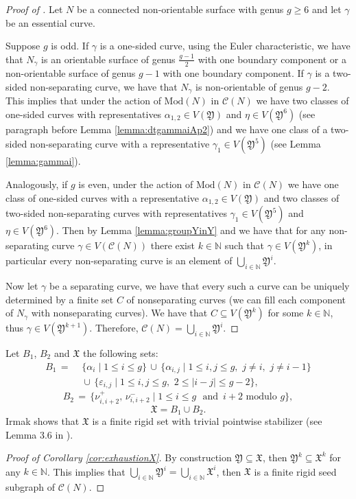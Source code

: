 \documentclass{artv3}
\newcommand*{\cg}[1]{\mathcal{C}(#1)}
\newcommand*{\mcg}[1]{\mathrm{Mod}(#1)}
\newcommand*{\Y}{\mathfrak{Y}}
\newcommand*{\X}{\mathfrak{X}}
\newcommand{\N}{\ensuremath{\mathbb{N}}}
\begin{document}
\begin{proof}[Proof of ]
Let $N$ be a connected non-orientable surface with genus $g\geq 6$ and let $\gamma$ be an essential curve. 

Suppose $g$ is odd. If $\gamma$  is a one-sided curve, using the Euler characteristic, we have that $N_{\gamma}$ is an orientable surface of genus $\frac{g-1}{2}$ with one boundary component or a non-orientable surface of genus $g-1$ with one boundary component. If $\gamma$ is a two-sided non-separating curve, we have that $N_{\gamma}$ is non-orientable of genus $g-2$. This implies that under the action of $\mcg{N}$ in $\cg{N}$ we have two classes of one-sided curves with representatives $\alpha_{1,2} \in V(\Y)$ and $\eta \in V(\Y^{6})$ (see paragraph before Lemma \ref{lemma:dtgammaiAp2}) and we have one class of a two-sided non-separating curve with a representative $\gamma_{1}\in V(\Y^{5})$ (see Lemma \ref{lemma:gammai}).

Analogously, if $g$ is even, under the action of $\mcg{N}$ in $\cg{N}$ we have one class of one-sided curves with a representative  $\alpha_{1,2} \in V(\Y)$ and two classes of two-sided non-separating curves with representatives $\gamma_1 \in V(\Y^{5})$ and $\eta\in V(\Y^{6})$.
Then by Lemma \ref{lemma:groupYinY} and  we have that for any non-separating curve $\gamma \in V(\cg{N})$ there exist $k\in\N$ such that $\gamma \in V(\Y^{k})$, in particular every non-separating curve is an element of $\bigcup_{i\in \N} \Y^{i}$.

Now let $\gamma$ be a separating curve, we have that every such a curve can be uniquely determined by a finite set $C$ of nonseparating curves (we can fill each component of $N_{\gamma}$ with nonseparating curves). We have that $C\subseteq V(\Y^{k})$ for some $k\in \N$, thus $\gamma\in V(\Y^{k+1})$. Therefore, $\cg{N} = \bigcup_{i\in \N}\Y^{i}$.
\end{proof}


Let $B_{1}$, $B_{2}$  and $\X$ the following sets:
\begin{align*}
B_1 \, = & \, \, \{ \alpha_{i} \mid 1\leq i \leq g \}\, \cup \, \{\alpha_{i,j} \mid 1\leq i,j\leq g, \,\, j\neq i, \,\, j \neq i-1   \}\\ 
& \,\, \cup \,  \{\varepsilon_{i,j} \mid  1\leq i,j\leq g, \,\, 2 \leq |i-j| \leq g-2  \},
\end{align*}
$$
B_{2}\, = \,\{\nu^{+}_{i,i+2},\, \nu^{-}_{i,i+2} \mid 1\leq i \leq g \,\, \text{ and } \, i+2 \text{ modulo } g  \},
$$
$$
\X = B_1\cup B_2.
$$
Irmak shows that $\X$ is a finite  rigid set with trivial pointwise stabilizer (see Lemma 3.6 in \cite{Irmak2019}).


\begin{proof}[Proof of Corollary \ref{cor:exhaustionX}]
 By construction $\Y\subseteq \X$, then  $\Y^{k} \subseteq \X^{k}$ for any  $k\in \N$. This implies that $\bigcup_{i\in \N}\Y^{i} = \bigcup_{i\in \N}\X^{i}$, then $\X$ is a finite rigid seed subgraph of $\cg{N}$.    
\end{proof}



\end{document}
